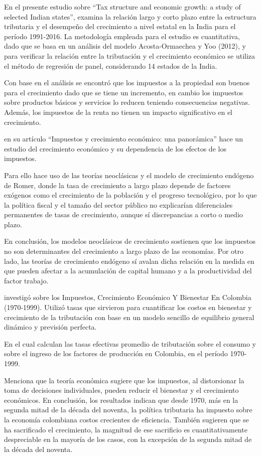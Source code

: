 \documentclass[
  letterpaper,
]{article}
\begin{document}
\textcite{neog_tax_2020} En el presente estudio sobre ``Tax structure
and economic growth: a study of selected Indian states'', examina la
relación largo y corto plazo entre la estructura tributaria y el
desempeño del crecimiento a nivel estatal en la India para el período
1991-2016. La metodología empleada para el estudio es cuantitativa, dado
que se basa en un análisis del modelo Acosta-Ormaechea y Yoo (2012), y
para verificar la relación entre la tributación y el crecimiento
económico se utiliza el método de regresión de panel, considerando 14
estados de la India.

Con base en el análisis se encontró que los impuestos a la propiedad son
buenos para el crecimiento dado que se tiene un incremento, en cambio
los impuestos sobre productos básicos y servicios lo reducen teniendo
consecuencias negativas. Además, los impuestos de la renta no tienen un
impacto significativo en el crecimiento.

\textcite{rivero_impuestos_2008} en su artículo ``Impuestos y
crecimiento económico: una panorámica'' hace un estudio del crecimiento
económico y su dependencia de los efectos de los impuestos.

Para ello hace uso de las teorías neoclásicas y el modelo de crecimiento
endógeno de Romer, donde la tasa de crecimiento a largo plazo depende de
factores exógenos como el crecimiento de la población y el progreso
tecnológico, por lo que la política fiscal y el tamaño del sector
público no explicarían diferenciales permanentes de tasas de
crecimiento, aunque sí discrepancias a corto o medio plazo.

En conclusión, los modelos neoclásicos de crecimiento sostienen que los
impuestos no son determinantes del crecimiento a largo plazo de las
economías. Por otro lado, las teorías de crecimiento endógeno sí avalan
dicha relación en la medida en que pueden afectar a la acumulación de
capital humano y a la productividad del factor trabajo.

\textcite{fergusson_impuestos_2003} investigó sobre los Impuestos,
Crecimiento Económico Y Bienestar En Colombia (1970-1999). Utilizó tasas
que sirvieron para cuantificar los costos en bienestar y crecimiento de
la tributación con base en un modelo sencillo de equilibrio general
dinámico y previsión perfecta.

En el cual calculan las tasas efectivas promedio de tributación sobre el
consumo y sobre el ingreso de los factores de producción en Colombia, en
el período 1970-1999.

Menciona que la teoría económica sugiere que los impuestos, al
distorsionar la toma de decisiones individuales, pueden reducir el
bienestar y el crecimiento económicos. En conclusión, los resultados
indican que desde 1970, más en la segunda mitad de la década del
noventa, la política tributaria ha impuesto sobre la economía colombiana
costos crecientes de eficiencia. También sugieren que se ha sacrificado
el crecimiento, la magnitud de ese sacrificio es cuantitativamente
despreciable en la mayoría de los casos, con la excepción de la segunda
mitad de la década del noventa.
\end{document}
